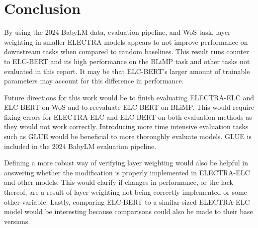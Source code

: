 \documentclass[11pt]{article}
\begin{document}
\section{Conclusion}

By using the 2024 BabyLM data, evaluation pipeline, and WoS task, layer weighting in smaller ELECTRA models appears to not improve performance on downstream tasks when compared to random baselines.
This result runs counter to
ELC-BERT and its high performance on the BLiMP task and other tasks not evaluated in this
report. It may be that ELC-BERT's larger amount of trainable parameters may account for this
difference in performance.

Future directions for this work would be to finish evaluating ELECTRA-ELC and ELC-BERT on WoS and to reevaluate ELC-BERT on BLiMP. This would require fixing errors for 
ELECTRA-ELC and ELC-BERT on both evaluation methods as they would not work correctly. 
Introducing more time intensive evaluation tasks such as GLUE 
\cite{wang2019gluemultitaskbenchmarkanalysis}
would be beneficial to more thoroughly evaluate models. GLUE is included in the 2024 BabyLM
evaluation pipeline.

Defining a more robust way of verifying layer weighting would also be helpful
in answering whether the modification is properly implemented in ELECTRA-ELC and other 
models. 
This would clarify if changes in performance, or the lack thereof, are a result of layer
weighting not being correctly implemented or some other variable. Lastly, comparing ELC-BERT 
to a similar sized ELECTRA-ELC model would be interesting because comparisons could also be made to their base versions.


\end{document}

